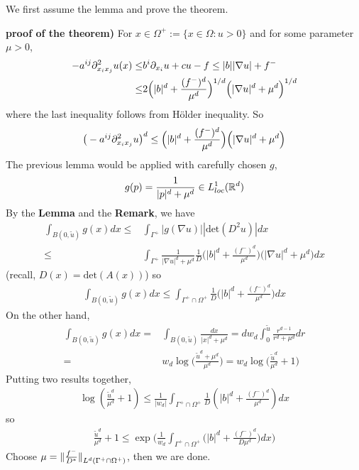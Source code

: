 \documentclass[12pt,a4paper]{article}
\newenvironment{proof}
{\begin{changemargin}{0.5cm}{0.5cm} 
	}%
	{\end{changemargin}
}
\newenvironment{p}
{\begin{proof} 
	}%
	{\end{proof}
}
\begin{document}
We first assume the lemma and prove the theorem.
\begin{p}
\textbf{proof of the theorem)} For $x\in \Omega^+ := \{x\in \Omega : u>0 \}$ and for some parameter $\mu>0$,
\begin{align*}
-a^{ij} \partial^2_{x_i x_j} u(x) \leq & b^i \partial_{x_i} u + cu -f \leq |b| |\nabla u| + f^- \\
\leq & 2 \Big(|b|^d + \frac{(f^-)^d}{\mu^d} \Big)^{1/d} \Big(|\nabla u|^d + \mu^d \Big)^{1/d}
\end{align*}
where the last inequality follows from H\"older inequality. So
\begin{align*}
\big( - a^{ij} \partial^2_{x_i x_j} u\big)^d \leq \Big(|b|^d + \frac{(f^-)^d}{\mu^d} \Big) \Big(|\nabla u|^d + \mu^d \Big)
\end{align*}
The previous lemma would be applied with carefully chosen $g$,
\begin{align*}
g(p) = \frac{1}{|p|^d + \mu^d} \in L^1_{loc}(\mathbb{R}^d)
\end{align*}
By the \textbf{Lemma} and the \textbf{Remark}, we have
\begin{align*}
\int_{B(0, \tilde{u})} g(x) dx \leq & \int_{\Gamma^+} |g(\nabla u)||\text{det}(D^2 u)| dx \\
\leq & \int_{\Gamma^+} \frac{1}{|\nabla u|^d + \mu^d} \frac{1}{D} \Big(|b|^d + \frac{(f^-)^d}{\mu^d} \Big) \Big(|\nabla u|^d + \mu^d \Big) dx
\end{align*}
(recall, $D(x) = \text{det}(A(x))$) so
\begin{align*}
\int_{B(0, \tilde{u})} g(x) dx \leq \int_{\Gamma^+ \cap \Omega^+} \frac{1}{D}  \Big(|b|^d + \frac{(f^-)^d}{\mu^d} \Big)dx
\end{align*}
On the other hand,
\begin{align*}
\int_{B(0, \tilde{u})} g(x) dx = & \int_{B(0, \tilde{u}) }\frac{dx}{|x|^d + \mu^d} = d w_d \int_0^{\tilde{u}}\frac{r^{d-1}}{r^d + \mu^d} dr \\
= & w_d \log \Big(\frac{\tilde{u}^d + \mu^d}{\mu^d} \Big) =w_d \log \Big( \frac{\tilde{u}^d}{\mu^d} +1 \Big) 
\end{align*}
Putting two results together,
\begin{align*}
\log (\frac{\tilde{u}^d}{\mu^d}+1) \leq \frac{1}{|w_d|} \int_{\Gamma^+ \cap \Omega^+} \frac{1}{D} (|b|^d + \frac{(f^-)^d}{\mu^d}) dx
\end{align*}
so
\begin{align*}
\frac{\tilde{u}^d}{\mu^d}+1 \leq \exp \Big( \frac{1}{w_d} \int_{\Gamma^+ \cap \Omega^+} \big( |b|^d + \frac{(f^-)^d}{D \mu^d} \big)dx\Big)
\end{align*}
Choose $\mu = \snorms{\frac{f^-}{D^*}}{L^d(\Gamma^+ \cap \Omega^+)}$, then we are done.

\eop
\end{p}
\s
\end{document}
